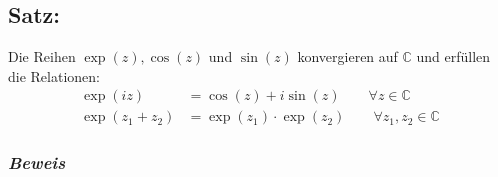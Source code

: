 \subsection*{Satz:}

Die Reihen $ \exp(z), \cos(z) $ und $ \sin(z) $ konvergieren auf $ \mathbb{C} $ und erfüllen die Relationen:
\begin{align*}
\exp(iz) &= \cos(z) + i \sin(z) \qquad \forall z \in \mathbb{C} \\
\exp(z_1 + z_2) &= \exp(z_1) \cdot \exp(z_2) \qquad \forall z_1, z_2 \in \mathbb{C}
\end{align*}

\subsubsection*{\emph{Beweis}}

